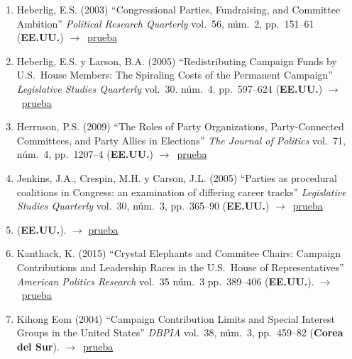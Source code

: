 \documentclass[12 pt, letter]{article}
\newenvironment{CitasMiTrabajo}{
    \begin{footnotesize}
    \begin{enumerate}[label={\footnotesize\emph{cita~\arabic*}},ref=\arabic*] %
        \setlength{\itemsep}{.1\itemsep}
        \setlength{\parskip}{.1\parskip}
    }{\end{enumerate}\end{footnotesize}}
\begin{document}
\begin{CitasMiTrabajo}
        \item Heberlig, E.S. (2003)
        ``Congressional Parties, Fundraising, and Committee Ambition'' \emph{Political Research Quarterly} vol.\ 56, n\'um.\ 2, pp.\ 151--61
        (\textbf{EE.UU.}) $\rightarrow$~\href{https://github.com/emagar/cv/blob/master/citasMiTrab/coxMagar/heber.pdf}{prueba}

       \item Heberlig, E.S. y Larson, B.A. (2005) ``Redistributing Campaign Funds by U.S.\ House Members: The Spiraling Costs of the Permanent Campaign'' \emph{Legislative Studies Quarterly} vol.\ 30. n\'um.\ 4. pp.\ 597--624 (\textbf{EE.UU.}) $\rightarrow$~\href{https://github.com/emagar/cv/blob/master/citasMiTrab/coxMagar/heberlig+larson2005lsq.excerpt.pdf}{prueba}

        \item Herrnson, P.S. (2009) ``The Roles of Party Organizations, Party-Connected Committees, and Party Allies in Elections'' \emph{The Journal of Politics} vol.\ 71, n\'um.\ 4, pp.\ 1207--4 (\textbf{EE.UU.}) $\rightarrow$~\href{https://github.com/emagar/cv/blob/master/citasMiTrab/coxMagar/herrnsonPartyOrginEls2009jop.pdf}{prueba}

        \item Jenkins, J.A., Crespin, M.H. y Carson, J.L. (2005)
        ``Parties as procedural coalitions in Congress: an examination of differing career tracks''
        \emph{Legislative Studies Quarterly} vol.\ 30, n\'um.\ 3, pp.\ 365--90  (\textbf{EE.UU.}) $\rightarrow$~\href{https://github.com/emagar/cv/blob/master/citasMiTrab/coxMagar/jenkinsetal2005lsq.pdf}{prueba}

        \item {} (\textbf{EE.UU.}). $\rightarrow$ \href{https://github.com/emagar/cv/blob/master/citasMiTrab/coxMagar/jenkins.monroeBuyNegAgenda2012ajps.pdf}{prueba}

        \item Kanthack, K. (2015) ``Crystal Elephants and Commitee Chairs: Campaign Contributions and Leadership Races in the U.S.\ House of Representatives'' \emph{American Politics Research} vol.\ 35 n\'um.\ 3 pp.\ 389--406 (\textbf{EE.UU.}). $\rightarrow$~\href{https://github.com/emagar/cv/blob/master/citasMiTrab/coxMagar/kanthak.ContributionsChairs2007apr.pdf}{prueba}

        \item Kihong Eom (2004)
        ``Campaign Contribution
        Limits and Special Interest Groups in the United States'' \emph{DBPIA} vol.\
        38, n\'um.\ 3, pp.\ 459--82  (\textbf{Corea del Sur}). $\rightarrow$~\href{https://github.com/emagar/cv/blob/master/citasMiTrab/coxMagar/eom.pdf}{prueba}


\end{CitasMiTrabajo}
\end{document}
